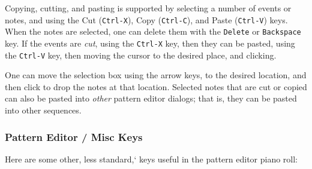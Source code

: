    Copying, cutting, and pasting is supported by selecting a number of events
   or notes, and using the
    Cut (\texttt{Ctrl-X}), 
    Copy (\texttt{Ctrl-C}), and
    Paste (\texttt{Ctrl-V})
   keys.
   When the notes are selected,
   one can delete them with the \texttt{Delete} or \texttt{Backspace} key.
   If the events are \textsl{cut}, using the \texttt{Ctrl-X} key, then
   they can be pasted, using the \texttt{Ctrl-V} key, then
   moving the cursor to the desired place, and clicking.

   One can move the selection box using the arrow keys, to the
   desired location, and then click to
   drop the notes at that location.
   Selected notes that are cut or copied can also be
   pasted into \textsl{other} pattern editor dialogs; that is, they can be
   pasted into other sequences.

\subsubsection{Pattern Editor / Misc Keys}
\label{subsubsec:pattern_editor_misc_keys}

   Here are some other, less standard,` keys useful in the pattern editor piano
   roll:

